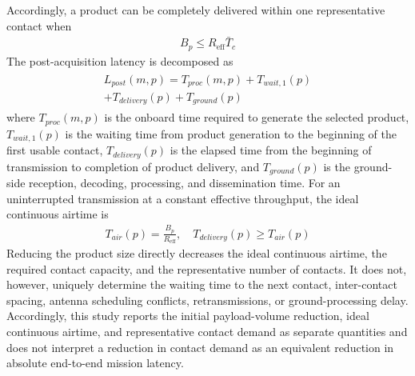 \documentclass[a4paper,fleqn]{cas-dc}
\begin{document}
Accordingly, a product can be completely delivered within one representative contact when
\begin{eqnarray}
	B_p \leq R_{\mathrm{eff}} \bar{T}_c
\end{eqnarray}
The post-acquisition latency is decomposed as
\begin{eqnarray}
	\begin{aligned}
	L_{post}(m,p) = T_{proc}(m,p) + T_{wait,1}(p) \\+ T_{delivery}(p) + T_{ground}(p)
	\end{aligned}
\end{eqnarray}
where \(T_{proc}(m,p)\) is the onboard time required to generate the selected product, \(T_{wait,1}(p)\) is the waiting time from product generation to the beginning of the first usable contact, \(T_{delivery}(p)\) is the elapsed time from the beginning of transmission to completion of product delivery, and \(T_{ground}(p)\) is the ground-side reception, decoding, processing, and dissemination time.
For an uninterrupted transmission at a constant effective throughput, the ideal continuous airtime is
\begin{eqnarray}
	T_{air}(p) = \frac{B_p}{R_{\mathrm{eff}}}, \quad T_{delivery}(p) \geq T_{air}(p)
\end{eqnarray}
Reducing the product size directly decreases the ideal continuous airtime, the required contact capacity, and the representative number of contacts. It does not, however, uniquely determine the waiting time to the next contact, inter-contact spacing, antenna scheduling conflicts, retransmissions, or ground-processing delay. Accordingly, this study reports the initial payload-volume reduction, ideal continuous airtime, and representative contact demand as separate quantities and does not interpret a reduction in contact demand as an equivalent reduction in absolute end-to-end mission latency.
\end{document}
